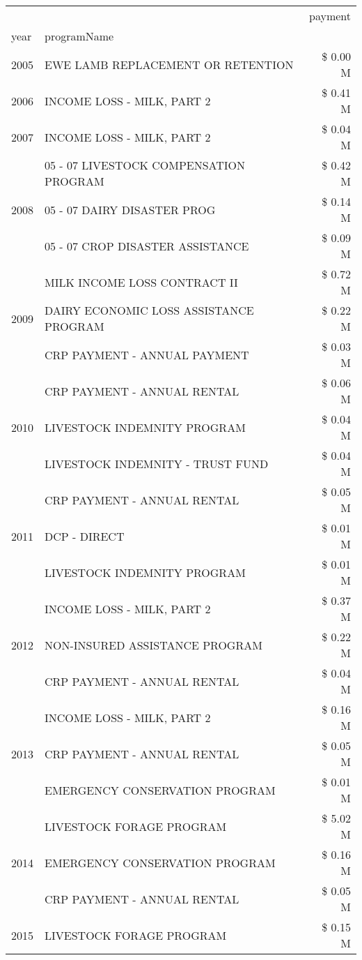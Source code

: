 \begin{tabular}{llr}
\toprule
 &  & payment \\
year & programName &  \\
\midrule
2005 & EWE LAMB REPLACEMENT OR RETENTION & \$ 0.00 M \\
\cline{1-3}
2006 & INCOME LOSS - MILK, PART 2 & \$ 0.41 M \\
\cline{1-3}
2007 & INCOME LOSS - MILK, PART 2 & \$ 0.04 M \\
\cline{1-3}
\multirow[t]{3}{*}{2008} & 05 - 07 LIVESTOCK COMPENSATION PROGRAM & \$ 0.42 M \\
 & 05 - 07 DAIRY DISASTER PROG & \$ 0.14 M \\
 & 05 - 07 CROP DISASTER ASSISTANCE & \$ 0.09 M \\
\cline{1-3}
\multirow[t]{3}{*}{2009} & MILK INCOME LOSS CONTRACT II & \$ 0.72 M \\
 & DAIRY ECONOMIC LOSS ASSISTANCE PROGRAM & \$ 0.22 M \\
 & CRP PAYMENT - ANNUAL PAYMENT & \$ 0.03 M \\
\cline{1-3}
\multirow[t]{3}{*}{2010} & CRP PAYMENT - ANNUAL RENTAL & \$ 0.06 M \\
 & LIVESTOCK INDEMNITY PROGRAM & \$ 0.04 M \\
 & LIVESTOCK INDEMNITY - TRUST FUND & \$ 0.04 M \\
\cline{1-3}
\multirow[t]{3}{*}{2011} & CRP PAYMENT - ANNUAL RENTAL & \$ 0.05 M \\
 & DCP - DIRECT & \$ 0.01 M \\
 & LIVESTOCK INDEMNITY PROGRAM & \$ 0.01 M \\
\cline{1-3}
\multirow[t]{3}{*}{2012} & INCOME LOSS - MILK, PART 2 & \$ 0.37 M \\
 & NON-INSURED ASSISTANCE PROGRAM & \$ 0.22 M \\
 & CRP PAYMENT - ANNUAL RENTAL & \$ 0.04 M \\
\cline{1-3}
\multirow[t]{3}{*}{2013} & INCOME LOSS - MILK, PART 2 & \$ 0.16 M \\
 & CRP PAYMENT - ANNUAL RENTAL & \$ 0.05 M \\
 & EMERGENCY CONSERVATION PROGRAM & \$ 0.01 M \\
\cline{1-3}
\multirow[t]{3}{*}{2014} & LIVESTOCK FORAGE PROGRAM & \$ 5.02 M \\
 & EMERGENCY CONSERVATION PROGRAM & \$ 0.16 M \\
 & CRP PAYMENT - ANNUAL RENTAL & \$ 0.05 M \\
\cline{1-3}
\multirow[t]{3}{*}{2015} & LIVESTOCK FORAGE PROGRAM & \$ 0.15 M \\

\end{tabular}

